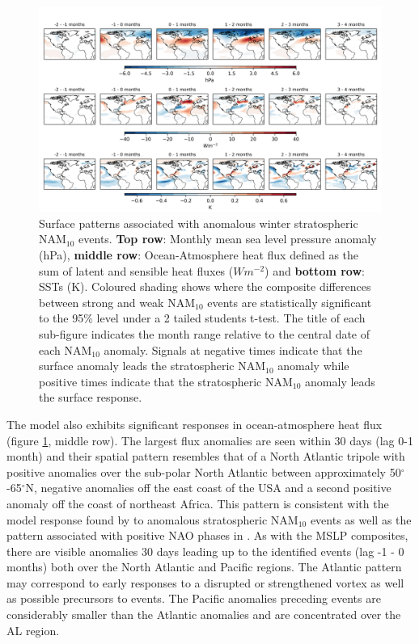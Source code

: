\begin{center}
\begin{figure}[h!]
\noindent\includegraphics[width = \linewidth]{Figures/Figures-surface/in_season_response_NAM_combined.png}
\caption[Surface response patterns to anomalous NAM$_{10}$ events.]{Surface patterns associated with anomalous winter stratospheric NAM$_{10}$ events. \textbf{Top row}: Monthly mean sea level pressure anomaly (hPa), \textbf{middle row}: Ocean-Atmosphere heat flux defined as the sum of latent and sensible heat fluxes ($Wm^{-2}$) and \textbf{bottom row}: SSTs (K). Coloured shading shows where the composite differences between strong and weak NAM$_{10}$ events are statistically significant to the 95\% level under a 2 tailed students t-test. The title of each sub-figure indicates the month range relative to the central date of each NAM$_{10}$ anomaly. Signals at negative times indicate that the surface anomaly leads the stratospheric NAM$_{10}$ anomaly while positive times indicate that the stratospheric NAM$_{10}$ anomaly leads the surface response.}
\label{fig:surface_comp_all}
\end{figure}
\end{center}
The model also exhibits significant responses in ocean-atmosphere heat flux (figure \ref{fig:surface_comp_all}, middle row). The largest flux anomalies are seen within 30 days (lag 0-1 month) and their spatial pattern resembles that of a North Atlantic tripole with positive anomalies over the sub-polar North Atlantic between approximately 50$^\circ$-65$^\circ$N, negative anomalies off the east coast of the USA and a second positive anomaly off the coast of northeast Africa. This pattern is consistent with the model response found by \cite{reichlerStratospheric2012b} to anomalous stratospheric NAM$_{10}$ events as well as the pattern associated with positive NAO phases in \cite{delworthImpact2016c}. As with the MSLP composites, there are visible anomalies 30 days leading up to the identified events (lag -1 - 0 months) both over the North Atlantic and Pacific regions. The Atlantic pattern may correspond to early responses to a disrupted or strengthened vortex as well as possible precursors to events. The Pacific anomalies preceding events are considerably smaller than the Atlantic anomalies and are concentrated over the AL region.

